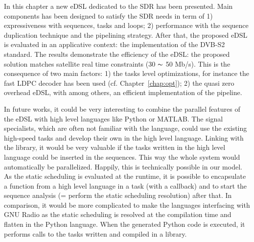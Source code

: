 In this chapter a new eDSL dedicated to the SDR has been presented. Main
components has been designed to satisfy the SDR needs in term of 1)
expressiveness with sequences, tasks and loops; 2) performance with the sequence
duplication technique and the pipelining strategy. After that, the proposed eDSL
is evaluated in an applicative context: the implementation of the DVB-S2
standard. The results demonstrate the efficiency of the \AFFECT eDSL: the
proposed solution matches satellite real time constraints (30 $\thicksim$ 50
Mb/s). This is the consequence of two main factors: 1) the tasks level
optimizations, for instance the fast LDPC decoder has been used (cf.
Chapter~\ref{chap:opt}); 2) the quasi zero overhead eDSL, with among others, an
efficient implementation of the pipeline.

In future works, it could be very interesting to combine the parallel features
of the \AFFECT eDSL with high level languages like Python or MATLAB. The signal
specialists, which are often not familiar with the \Cxx language, could use the
existing high-speed \Cxx tasks and develop their own in the high level
language. Linking with the \AFFECT library, it would be very valuable if the
tasks written in the high level language could be inserted in the \AFFECT
sequences. This way the whole system would automatically be parallelized.
Happily, this is technically possible in our model. As the static scheduling is
evaluated at the runtime, it is possible to encapsulate a function from a high
level language in a \AFFECT task (with a callback) and to start the sequence
analysis (= perform the static scheduling resolution) after that. In comparison,
it would be more complicated to make the languages interfacing with GNU Radio as
the static scheduling is resolved at the compilation time and flatten in the
Python language. When the generated Python code is executed, it performs calls
to the tasks written and compiled in a \Cxx library.